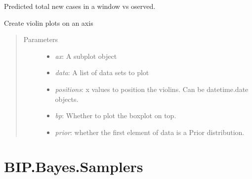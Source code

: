 \documentclass[a4paper,10pt,english]{sphinxmanual}
\begin{document}

\begin{fulllineitems}
Predicted total new cases in a window vs oserved.

\end{fulllineitems}


\begin{fulllineitems}
Create violin plots on an axis
\begin{quote}\begin{description}
\item[{Parameters}] \leavevmode\begin{itemize}
\item {} 
\emph{ax}: A subplot object

\item {} 
\emph{data}: A list of data sets to plot

\item {} 
\emph{positions}: x values to position the violins. Can be datetime.date objects.

\item {} 
\emph{bp}: Whether to plot the boxplot on top.

\item {} 
\emph{prior}: whether the first element of data is a Prior distribution.

\end{itemize}

\end{description}\end{quote}

\end{fulllineitems}



\section{BIP.Bayes.Samplers}
\label{BIP.Bayes.Samplers:module-BIP.Bayes.Samplers}\label{BIP.Bayes.Samplers::doc}\label{BIP.Bayes.Samplers:bip-bayes-samplers}
\end{document}

